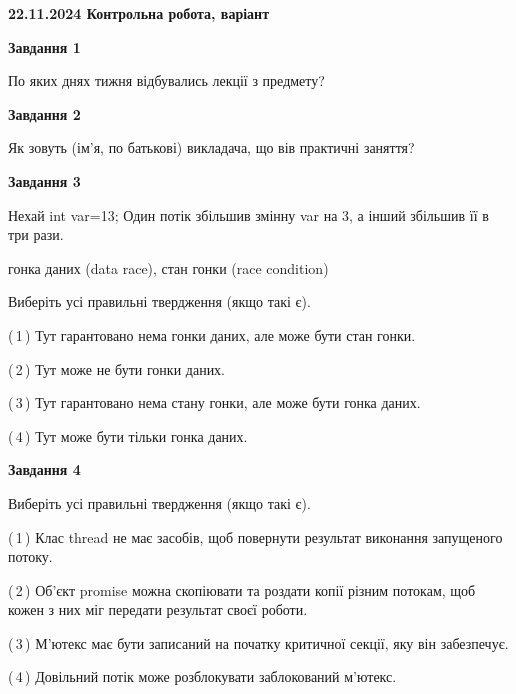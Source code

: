 \documentclass[12pt, ukrainian]{article}
\begin{document}
\begin {large}

\textbf{22.11.2024 Контрольна робота, варіант  }\par


{

\begin{center}
\textbf{Завдання 1}
\end{center}

По яких днях тижня відбувались лекції з предмету?


\begin{center}
\textbf{Завдання 2}
\end{center}

Як зовуть (ім'я, по батькові) викладача, що вів практичні заняття?


\begin{center}
\textbf{Завдання 3}
\end{center}

Нехай int var=13; Один потік збільшив змінну var на 3, а інший збільшив її в три рази.

гонка даних (data race), стан гонки (race condition)

Виберіть усі правильні твердження (якщо такі є).\par
\vspace{2mm}
(\,1\,) Тут гарантовано нема гонки даних, але може бути стан гонки.%

(\,2\,) Тут може не бути гонки даних.%

(\,3\,) Тут гарантовано нема стану гонки, але може бути гонка даних.%

(\,4\,) Тут може бути тільки гонка даних.%


\begin{center}
\textbf{Завдання 4}
\end{center}

Виберіть усі правильні твердження (якщо такі є).\par
\vspace{2mm}

(\,1\,) Клас thread не має засобів, щоб повернути результат виконання запущеного потоку.%

(\,2\,) Об’єкт promise можна скопіювати та роздати копії різним потокам, щоб кожен з них міг передати результат своєї роботи.%

(\,3\,) М’ютекс має бути записаний на початку критичної секції, яку він забезпечує.%

(\,4\,) Довільний потік може розблокувати заблокований м’ютекс.%


}
\end{large}
\end{document}
